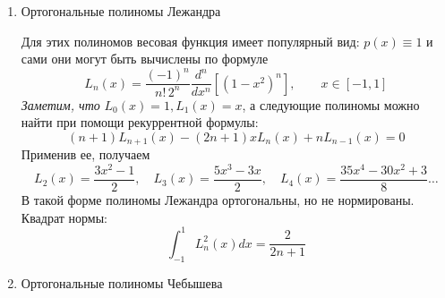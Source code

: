 \documentclass[../../calc-math-exam-2023.tex]{subfiles}
\begin{document}
    \begin{enumerate}
        \item Ортогональные полиномы Лежандра
        \vspace{5pt}

        Для этих полиномов весовая функция имеет популярный вид: $p(x) \equiv 1$ и сами они
        могут быть вычислены по формуле
        \begin{equation}
            \displaystyle L_n(x) = \frac{(-1)^n}{n!\, 2^n} \frac{d^n}{dx^n} \left[ \left( 1 - x^2 \right)^n \right], \qquad x \in [-1, 1] \label{eq:legendre}
        \end{equation}
        \emph{Заметим, что} $ \displaystyle L_0(x) = 1, L_1(x) = x$, а следующие полиномы
        можно найти при помощи рекуррентной формулы:
        \begin{equation*}
            (n+1)L_{n+1}(x) - (2n+1)xL_n(x) + nL_{n-1}(x) = 0
        \end{equation*}
        Применив ее, получаем
        \begin{equation*}
            L_2(x) = \frac{3x^2-1}{2}, \quad L_3(x) = \frac{5x^3-3x}{2}, \quad L_4(x) = \frac{35x^4-30x^2+3}{8}\dots
        \end{equation*}
        В такой форме полиномы Лежандра ортогональны, но не нормированы. Квадрат нормы:
        \begin{equation*}
            \int_{-1}^{1} L_n^2(x)dx = \frac{2}{2n+1}
        \end{equation*}

        \item Ортогональные полиномы Чебышева
        \vspace{5pt}


\end{enumerate}
\end{document}
